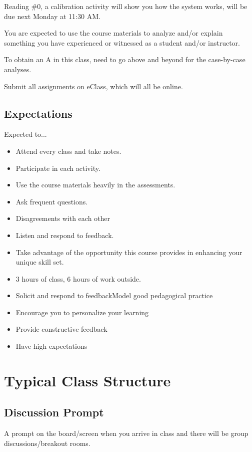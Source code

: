 \documentclass[11pt]{amsart}
\begin{document}
Reading \#0, a calibration activity will show you how the system works, will be due next Monday at 11:30 AM.

You are expected to use the course materials to analyze and/or explain something you have experienced or witnessed as a student and/or instructor.

To obtain an A in this class, need to go above and beyond for the case-by-case analyses.

Submit all assignments on eClass, which will all be online.

\subsection{Expectations}

Expected to...
\begin{itemize}
    \item Attend every class and take notes.
    \item Participate in each activity.
    \item Use the course materials heavily in the assessments.
    \item Ask frequent questions.
    \item Disagreements with each other
    \item Listen and respond to feedback.
    \item Take advantage of the opportunity this course provides in enhancing your unique skill set.
    \item 3 hours of class, 6 hours of work outside.
    \item Solicit and respond to feedbackModel good pedagogical practice
    \item Encourage you to personalize your learning
    \item Provide constructive feedback
    \item Have high expectations
\end{itemize}

\section{Typical Class Structure}

\subsection{Discussion Prompt}

A prompt on the board/screen when you arrive in class and there will be group discussions/breakout rooms.
\end{document}
